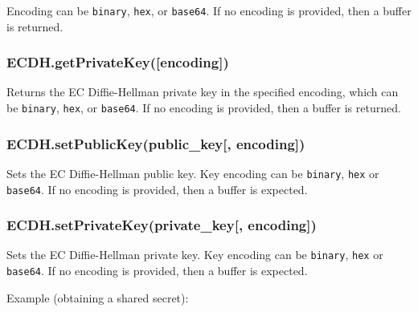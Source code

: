 Encoding can be \texttt{\textquotesingle{}binary\textquotesingle{}},
\texttt{\textquotesingle{}hex\textquotesingle{}}, or
\texttt{\textquotesingle{}base64\textquotesingle{}}. If no encoding is
provided, then a buffer is returned.

\subsubsection{ECDH.getPrivateKey({[}encoding{]})}\label{ecdh.getprivatekeyencoding}

Returns the EC Diffie-Hellman private key in the specified encoding,
which can be \texttt{\textquotesingle{}binary\textquotesingle{}},
\texttt{\textquotesingle{}hex\textquotesingle{}}, or
\texttt{\textquotesingle{}base64\textquotesingle{}}. If no encoding is
provided, then a buffer is returned.

\subsubsection{ECDH.setPublicKey(public\_key{[},
encoding{]})}\label{ecdh.setpublickeypublicux5fkey-encoding}

Sets the EC Diffie-Hellman public key. Key encoding can be
\texttt{\textquotesingle{}binary\textquotesingle{}},
\texttt{\textquotesingle{}hex\textquotesingle{}} or
\texttt{\textquotesingle{}base64\textquotesingle{}}. If no encoding is
provided, then a buffer is expected.

\subsubsection{ECDH.setPrivateKey(private\_key{[},
encoding{]})}\label{ecdh.setprivatekeyprivateux5fkey-encoding}

Sets the EC Diffie-Hellman private key. Key encoding can be
\texttt{\textquotesingle{}binary\textquotesingle{}},
\texttt{\textquotesingle{}hex\textquotesingle{}} or
\texttt{\textquotesingle{}base64\textquotesingle{}}. If no encoding is
provided, then a buffer is expected.

Example (obtaining a shared secret):

